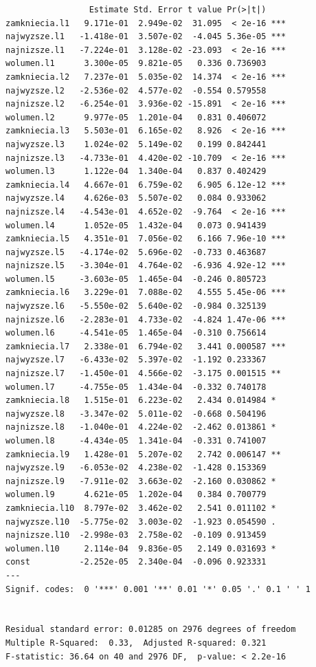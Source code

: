 \documentclass[
  polish,
  letterpaper,
  DIV=11,
  numbers=noendperiod]{scrartcl}
\begin{document}
\begin{verbatim}
                 Estimate Std. Error t value Pr(>|t|)    
zamkniecia.l1   9.171e-01  2.949e-02  31.095  < 2e-16 ***
najwyzsze.l1   -1.418e-01  3.507e-02  -4.045 5.36e-05 ***
najnizsze.l1   -7.224e-01  3.128e-02 -23.093  < 2e-16 ***
wolumen.l1      3.300e-05  9.821e-05   0.336 0.736903    
zamkniecia.l2   7.237e-01  5.035e-02  14.374  < 2e-16 ***
najwyzsze.l2   -2.536e-02  4.577e-02  -0.554 0.579558    
najnizsze.l2   -6.254e-01  3.936e-02 -15.891  < 2e-16 ***
wolumen.l2      9.977e-05  1.201e-04   0.831 0.406072    
zamkniecia.l3   5.503e-01  6.165e-02   8.926  < 2e-16 ***
najwyzsze.l3    1.024e-02  5.149e-02   0.199 0.842441    
najnizsze.l3   -4.733e-01  4.420e-02 -10.709  < 2e-16 ***
wolumen.l3      1.122e-04  1.340e-04   0.837 0.402429    
zamkniecia.l4   4.667e-01  6.759e-02   6.905 6.12e-12 ***
najwyzsze.l4    4.626e-03  5.507e-02   0.084 0.933062    
najnizsze.l4   -4.543e-01  4.652e-02  -9.764  < 2e-16 ***
wolumen.l4      1.052e-05  1.432e-04   0.073 0.941439    
zamkniecia.l5   4.351e-01  7.056e-02   6.166 7.96e-10 ***
najwyzsze.l5   -4.174e-02  5.696e-02  -0.733 0.463687    
najnizsze.l5   -3.304e-01  4.764e-02  -6.936 4.92e-12 ***
wolumen.l5     -3.603e-05  1.465e-04  -0.246 0.805723    
zamkniecia.l6   3.229e-01  7.088e-02   4.555 5.45e-06 ***
najwyzsze.l6   -5.550e-02  5.640e-02  -0.984 0.325139    
najnizsze.l6   -2.283e-01  4.733e-02  -4.824 1.47e-06 ***
wolumen.l6     -4.541e-05  1.465e-04  -0.310 0.756614    
zamkniecia.l7   2.338e-01  6.794e-02   3.441 0.000587 ***
najwyzsze.l7   -6.433e-02  5.397e-02  -1.192 0.233367    
najnizsze.l7   -1.450e-01  4.566e-02  -3.175 0.001515 ** 
wolumen.l7     -4.755e-05  1.434e-04  -0.332 0.740178    
zamkniecia.l8   1.515e-01  6.223e-02   2.434 0.014984 *  
najwyzsze.l8   -3.347e-02  5.011e-02  -0.668 0.504196    
najnizsze.l8   -1.040e-01  4.224e-02  -2.462 0.013861 *  
wolumen.l8     -4.434e-05  1.341e-04  -0.331 0.741007    
zamkniecia.l9   1.428e-01  5.207e-02   2.742 0.006147 ** 
najwyzsze.l9   -6.053e-02  4.238e-02  -1.428 0.153369    
najnizsze.l9   -7.911e-02  3.663e-02  -2.160 0.030862 *  
wolumen.l9      4.621e-05  1.202e-04   0.384 0.700779    
zamkniecia.l10  8.797e-02  3.462e-02   2.541 0.011102 *  
najwyzsze.l10  -5.775e-02  3.003e-02  -1.923 0.054590 .  
najnizsze.l10  -2.998e-03  2.758e-02  -0.109 0.913459    
wolumen.l10     2.114e-04  9.836e-05   2.149 0.031693 *  
const          -2.252e-05  2.340e-04  -0.096 0.923331    
---
Signif. codes:  0 '***' 0.001 '**' 0.01 '*' 0.05 '.' 0.1 ' ' 1


Residual standard error: 0.01285 on 2976 degrees of freedom
Multiple R-Squared:  0.33,  Adjusted R-squared: 0.321 
F-statistic: 36.64 on 40 and 2976 DF,  p-value: < 2.2e-16 



\end{verbatim}
\end{document}
